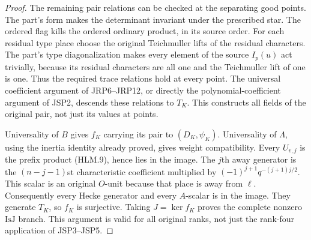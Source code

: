 \documentclass[11pt,a4paper]{article}
\numberwithin{equation}{section}
\theoremstyle{remark}\newtheorem{remark}[theorem]{Remark}
\begin{document}
\begin{proof}
The remaining pair relations can be checked at the separating
good points.  The part's form makes the determinant invariant
under the prescribed star.  The ordered flag kills the ordered
ordinary product, in its source order.  For each residual type
place choose the original Teichmuller lifts of the residual
characters.  The part's type diagonalization makes every
element of the source \(I_p(u)\) act trivially, because its
residual characters are all one and the Teichmuller lift of one
is one.  Thus the required trace relations hold at every point.
The universal coefficient argument of JRP6--JRP12, or directly
the polynomial-coefficient argument of JSP2, descends these
relations to \(T_K\).  This constructs all fields of the
original pair, not just its values at points.

Universality of \(B\) gives \(f_K\) carrying its pair to
\((D_K,\psi_K)\).  Universality of \(\Lambda\), using the
inertia identity already proved, gives weight compatibility.
Every \(U_{v,j}\) is the prefix product (HLM.9), hence lies
in the image.  The \(j\)th away generator is the
\((n-j-1)\)st characteristic coefficient multiplied by
\((-1)^{j+1}q^{-(j+1)j/2}\).  This scalar is an original
\(O\)-unit because that place is away from \(\ell\).
Consequently every Hecke generator and every \(A\)-scalar
is in the image.  They generate \(T_K\), so \(f_K\) is
surjective.  Taking \(J=\ker f_K\) proves the complete
nonzero \(\mathrm{IsJ}\) branch.  This argument is valid
for all original ranks, not just the rank-four application
of JSP3--JSP5.
\end{proof}

\end{document}
